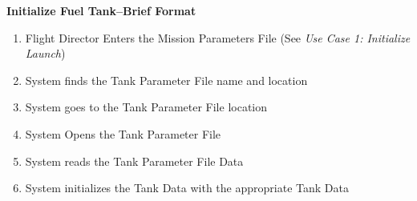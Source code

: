 \documentclass[letterpaper]{article}
\begin{document}
\noindent
\textbf{Initialize Fuel Tank--Brief Format}
\begin{enumerate}
   \item Flight Director Enters the Mission Parameters File (See 
      \textit{Use Case 1: Initialize Launch})
   \item System finds the Tank Parameter File name and location
   \item System goes to the Tank Parameter File location
   \item System Opens the Tank Parameter File
   \item System reads the Tank Parameter File Data
   \item System initializes the Tank Data with the appropriate Tank 
      Data
\end{enumerate}
\end{document}
